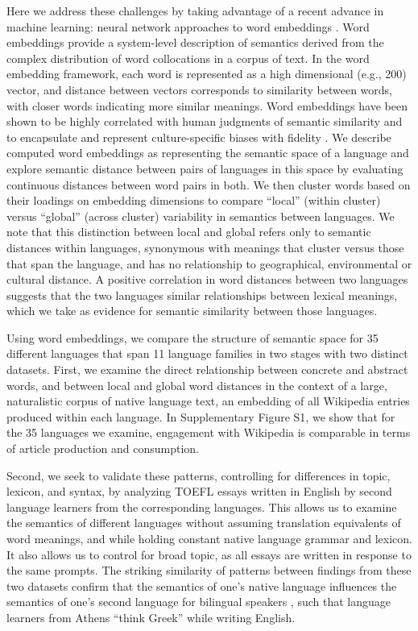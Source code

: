 \documentclass[9pt,twocolumn,twoside,lineno]{pnas-new}
\begin{document}
Here we address these challenges by taking advantage of a recent advance in machine learning: neural network approaches to word embeddings \cite{bojanowski2016enriching,mikolov2013efficient}. Word embeddings provide a system-level description of semantics derived from the complex distribution of word collocations in a corpus of text. In the word embedding framework, each word is represented as a high dimensional (e.g., 200) vector, and distance between vectors corresponds to similarity between words, with closer words indicating more similar meanings. Word embeddings have been shown to be highly correlated with human judgments of semantic similarity and to encapsulate and represent culture-specific biases with fidelity \cite{hill2015simlex,caliskan2017semantics,garg2018word,bolukbasi2016man,kozlowski2019geometry,lewis2020}. We describe computed word embeddings as representing the semantic space of a language and explore semantic distance between pairs of languages in this space by evaluating continuous distances between word pairs in both. We then cluster words based on their loadings on embedding dimensions to compare ``local'' (within cluster) versus ``global'' (across cluster) variability in semantics between languages. We note that this distinction between local and global refers only to semantic distances within languages, synonymous with meanings that cluster versus those that span the language, and has no relationship to geographical, environmental or cultural distance. A positive correlation in word distances between two languages suggests that the two languages similar relationships between lexical meanings, which we take as evidence for semantic similarity between those languages.


Using word embeddings, we compare the structure of semantic space for 35 different languages that span 11 language families in two stages with two distinct datasets. First, we examine the direct relationship between concrete and abstract words, and between local and global word distances in the context of a large, naturalistic corpus of native language text, an embedding of all Wikipedia entries produced within each language. In Supplementary Figure S1, we show that for the 35 languages we examine, engagement with Wikipedia is comparable in terms of article production and consumption.

Second, we seek to validate these patterns, controlling for differences in topic, lexicon, and syntax, by analyzing TOEFL essays written in English by second language learners from the corresponding languages. This allows us to examine the semantics of different languages without assuming translation equivalents of word meanings, and while holding constant native language grammar and lexicon. It also allows us to control for broad topic, as all essays are written in response to the same prompts. The striking similarity of patterns between findings from these two datasets confirm that the semantics of one's native language influences the semantics of one's second language for bilingual speakers \cite{ameel2009semantic}, such that language learners from Athens ``think Greek'' while writing English. 
\end{document}
